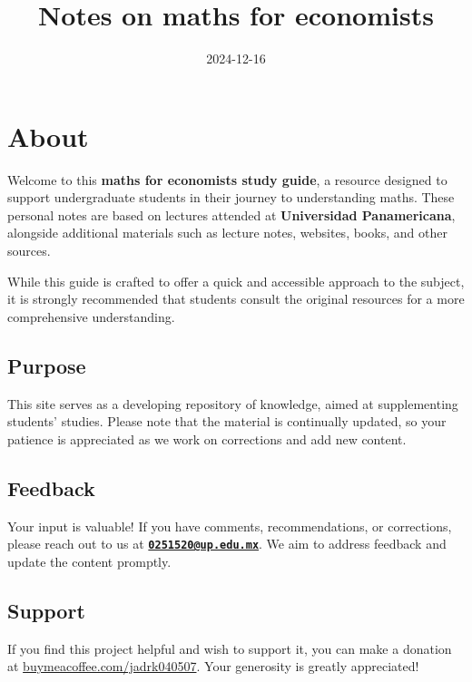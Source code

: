 \documentclass[
]{book}
\title{Notes on maths for economists}
\author{}
\date{\vspace{-2.5em}2024-12-16}
\theoremstyle{definition}
\theoremstyle{definition}
\theoremstyle{definition}
\theoremstyle{definition}
\theoremstyle{remark}
\begin{document}
\maketitle

{
\setcounter{tocdepth}{1}
\tableofcontents
}
\hypertarget{about}{%
\chapter{About}\label{about}}

Welcome to this \textbf{maths for economists study guide}, a resource designed to support undergraduate students in their journey to understanding maths. These personal notes are based on lectures attended at \textbf{Universidad Panamericana}, alongside additional materials such as lecture notes, websites, books, and other sources.

While this guide is crafted to offer a quick and accessible approach to the subject, it is strongly recommended that students consult the original resources for a more comprehensive understanding.

\hypertarget{purpose}{%
\section{Purpose}\label{purpose}}

This site serves as a developing repository of knowledge, aimed at supplementing students' studies. Please note that the material is continually updated, so your patience is appreciated as we work on corrections and add new content.

\hypertarget{feedback}{%
\section{Feedback}\label{feedback}}

Your input is valuable! If you have comments, recommendations, or corrections, please reach out to us at \textbf{\href{mailto:0251520@up.edu.mx}{\nolinkurl{0251520@up.edu.mx}}}. We aim to address feedback and update the content promptly.

\hypertarget{support}{%
\section{Support}\label{support}}

If you find this project helpful and wish to support it, you can make a donation at \href{https://buymeacoffee.com/jadrk040507}{buymeacoffee.com/jadrk040507}. Your generosity is greatly appreciated!
\end{document}

